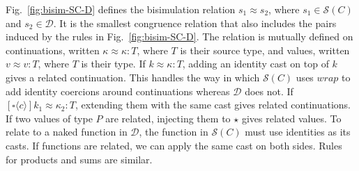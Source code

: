 \documentclass[acmsmall,review,anonymous]{acmart}\settopmatter{printfolios=true,printccs=false,printacmref=false}
\newcommand{\TOOdyn}[0]{\star}
\newcommand{\kOOcast}[2]{
  [\square \langle #1 \rangle]#2}
\newcommand{\ineffCEKD}{\ensuremath{\mathcal{D}}}
\newcommand{\effCEK}[1]{\ensuremath{\mathcal{S}(#1)}}
\begin{document}
Fig.~\ref{fig:bisim-SC-D} defines the bisimulation relation
$s_1 \approx s_2$, where $s_1 \in \effCEK{C}$ and $s_2 \in \ineffCEKD{}$.
It is the smallest congruence relation that also includes the
pairs induced by the rules in Fig.~\ref{fig:bisim-SC-D}.
%
The relation is mutually defined on continuations, written $\kappa
\approx \kappa : T$, where $T$ is their source type, and values, written $v 
\approx v : T$, where $T$ is their type.
%
If $k \approx \kappa : T$, adding an identity cast on top of $k$ gives a 
related continuation. This handles the way in which
\effCEK{C} uses $wrap$ to add identity coercions around continuations
whereas \ineffCEKD{} does not.
%
%
If $\kOOcast{c}{k_1} \approx \kappa_2 : T$, extending them with 
the same cast gives related continuations.
%
If two values of type $P$ are related, injecting them to $\TOOdyn$ gives 
related values.
%
%
To relate to a naked function in \ineffCEKD, the function in \effCEK{C} 
must use identities as its casts.
%
If functions are related, we can apply the same cast on both sides.
%
Rules for products and sums are similar.
\end{document}
